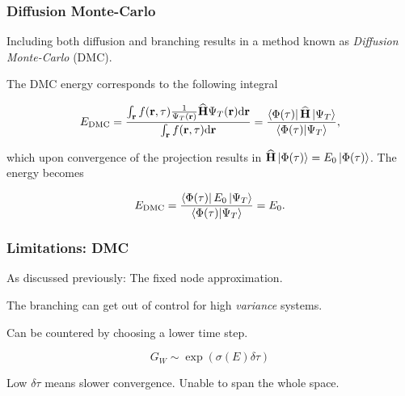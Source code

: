%  
%  
%  
%  
%  
% 
%  
%  

\begin{frame}
\frametitle{Diffusion Monte-Carlo}
Including both diffusion and branching results in a method known as \textit{Diffusion Monte-Carlo} (DMC).
\shift

The DMC energy corresponds to the following integral

\begin{equation*}
 E_{\mathrm{DMC}} = \frac{\int_\mathbf{r} f(\mathbf{r}, \tau) \frac{1}{\Psi_T(\mathbf{r})}{\bf\widehat{H}} \Psi_T(\mathbf{r})\mathrm{d}\mathbf{r}}{\int_\mathbf{r} f(\mathbf{r}, \tau)\mathrm{d}\mathbf{r}}  = \frac{\left< \Phi(\tau) \right| {\bf\widehat{H}} \left| \Psi_T \right>}{\left\langle \Phi(\tau) | \Psi_T\right\rangle},
\end{equation*}

\pause
which upon convergence of the projection results in ${\bf\widehat{H}}\left| \Phi(\tau) \right> = E_0\left| \Phi(\tau) \right>$. The energy becomes

\begin{equation*}
 E_{\mathrm{DMC}} = \frac{\left< \Phi(\tau) \right|E_0\left| \Psi_T \right>}{\left\langle \Phi(\tau) | \Psi_T\right\rangle} = E_0.
\end{equation*}

\end{frame}




\begin{frame}
  \frametitle{Limitations: DMC}
  
  As discussed previously: The fixed node approximation.
  \shift
  
  The branching can get out of control for high \textit{variance} systems. 
  \shift
  
  Can be countered by choosing a lower time step. 
  
  \begin{equation*}
   G_W \sim \exp(\sigma(E)\delta\tau)
  \end{equation*}
  \shift
  
  Low $\delta\tau$ means slower convergence. Unable to span the whole space.
  
\end{frame}

